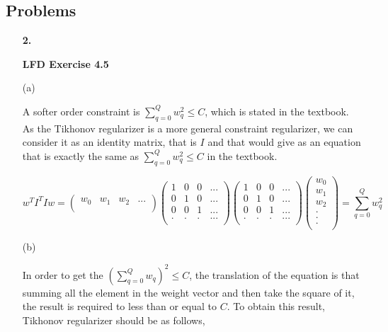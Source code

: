 \documentclass[11pt]{article}
\begin{document}
\pagebreak

\subsection*{Problems}
\begin{enumerate}

\item[\textbf{2.}]

\textbf{LFD Exercise 4.5}

(a)

A softer order constraint is $\sum_{q=0}^{Q}w_q^2 \leq C$, which is stated in the textbook.
As the Tikhonov regularizer is a more general constraint regularizer, we can consider it as an identity matrix, that is $I$ and that would give as an equation that is exactly the same as $\sum_{q=0}^{Q}w_q^2 \leq C$ in the textbook.

\begin{equation}
w^TI^TIw = 
\begin{pmatrix}
	w_0 & w_1 & w_2 & ...\\
\end{pmatrix}
\begin{pmatrix}
	1 & 0 & 0 & ... \\
	0 & 1 & 0 & ... \\
	0 & 0 & 1 & ... \\
	. & . & . & ...\\
\end{pmatrix}
\begin{pmatrix}
	1 & 0 & 0 & ... \\
	0 & 1 & 0 & ... \\
	0 & 0 & 1 & ... \\
	. & . & . & ...\\
\end{pmatrix}
\begin{pmatrix}
	w_0 \\
	w_1\\
	w_2\\
	.\\
	.\\
	.\\
\end{pmatrix}
= \sum_{q=0}^{Q}w_q^2
\end{equation}

(b)

In order to get the $(\sum_{q=0}^{Q}w_q)^2 \leq C$, the translation of the equation is that summing all the element in the weight vector and then take the square of it, the result is required to less than or equal to $C$. To obtain this result, Tikhonov regularizer should be as follows,


\end{enumerate}
\end{document}
